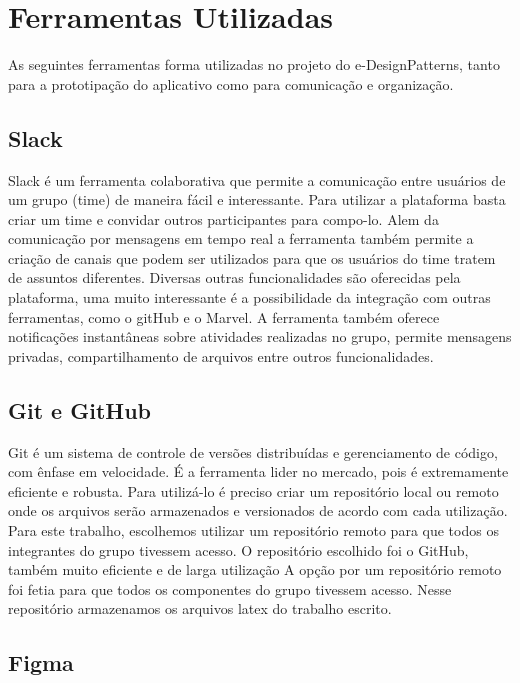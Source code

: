 \section{Ferramentas Utilizadas}

As seguintes ferramentas forma utilizadas no projeto do e-DesignPatterns, tanto para a prototipação do aplicativo como para comunicação e organização.

\subsection{Slack}
Slack \cite{slack} é um ferramenta colaborativa que permite a comunicação entre usuários de um grupo (time) de maneira fácil e interessante. Para utilizar a plataforma basta criar um time e convidar outros participantes para compo-lo. Alem da comunicação por mensagens em tempo real a ferramenta também permite a criação de canais que podem ser utilizados para que os usuários do time tratem de assuntos diferentes. Diversas outras funcionalidades são oferecidas pela plataforma, uma muito interessante é a possibilidade da integração com outras ferramentas, como o gitHub e o Marvel.  A ferramenta também oferece notificações instantâneas sobre atividades realizadas no grupo, permite mensagens privadas, compartilhamento de arquivos entre outros funcionalidades.

\subsection{Git e GitHub}

Git \cite{git} é um sistema de controle de versões distribuídas e gerenciamento de código, com ênfase em velocidade. É a ferramenta lider no mercado, pois é extremamente eficiente e robusta. Para utilizá-lo é preciso criar um repositório local ou remoto onde os arquivos serão armazenados e versionados de acordo com cada utilização. Para este trabalho, escolhemos utilizar um repositório remoto para que todos os integrantes do grupo tivessem acesso. O repositório escolhido foi o GitHub, também muito eficiente e de larga utilização A opção por um repositório remoto foi fetia para que todos os componentes do grupo tivessem acesso. Nesse repositório armazenamos os arquivos latex do trabalho escrito.

\subsection{Figma}

